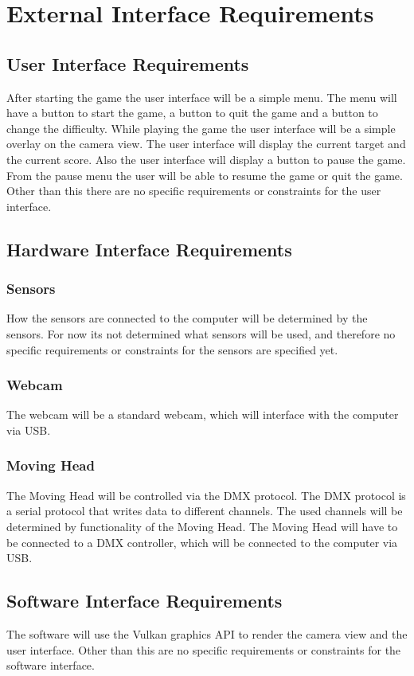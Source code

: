 \documentclass[a4paper]{scrreprt}
\begin{document}
\section{External Interface Requirements}
\subsection{User Interface Requirements}
After starting the game the user interface will be a simple menu.
The menu will have a button to start the game, a button to quit the game and a button to change the difficulty.
While playing the game the user interface will be a simple overlay on the camera view.
The user interface will display the current target and the current score.
Also the user interface will display a button to pause the game.
From the pause menu the user will be able to resume the game or quit the game.
Other than this there are no specific requirements or constraints for the user interface.

\subsection{Hardware Interface Requirements}
\subsubsection{Sensors}
How the sensors are connected to the computer will be determined by the sensors.
For now its not determined what sensors will be used, and therefore no specific requirements or constraints for the sensors are specified yet.

\subsubsection{Webcam}
The webcam will be a standard webcam, which will interface with the computer via USB.

\subsubsection{Moving Head}
The Moving Head will be controlled via the DMX protocol.
The DMX protocol is a serial protocol that writes data to different channels.
The used channels will be determined by functionality of the Moving Head.
The Moving Head will have to be connected to a DMX controller, which will be connected to the computer via USB.

\subsection{Software Interface Requirements}
The software will use the Vulkan graphics API to render the camera view and the user interface.
Other than this are no specific requirements or constraints for the software interface.
\end{document}
